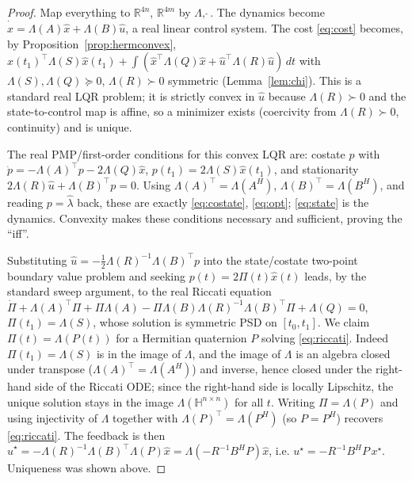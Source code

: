 \documentclass{amsart}
\theoremstyle{definition}
\newcommand{\HH}{\mathbb{H}}
\newcommand{\RR}{\mathbb{R}}
\begin{document}
\begin{proof}
Map everything to $\RR^{4n}$, $\RR^{4m}$ by $\Lambda,\widehat{\;}$. The
dynamics become $\dot{\widehat x}=\Lambda(A)\widehat x+\Lambda(B)\widehat
u$, a real linear control system. The cost \eqref{eq:cost} becomes, by
Proposition~\ref{prop:hermconvex},
$\widehat x(t_1)^\top\Lambda(S)\widehat x(t_1)+\int(\widehat
x^\top\Lambda(Q)\widehat x+\widehat u^\top\Lambda(R)\widehat u)\,dt$
with $\Lambda(S),\Lambda(Q)\succeq0$, $\Lambda(R)\succ0$ symmetric
(Lemma~\ref{lem:chi}). This is a standard real LQR problem; it is
strictly convex in $\widehat u$ because $\Lambda(R)\succ0$ and the
state-to-control map is affine, so a minimizer exists (coercivity from
$\Lambda(R)\succ0$, continuity) and is unique.

The real PMP/first-order conditions for this convex LQR are: costate
$p$ with $\dot p=-\Lambda(A)^\top p-2\Lambda(Q)\widehat x$,
$p(t_1)=2\Lambda(S)\widehat x(t_1)$, and stationarity
$2\Lambda(R)\widehat u+\Lambda(B)^\top p=0$. Using
$\Lambda(A)^\top=\Lambda(A^H)$, $\Lambda(B)^\top=\Lambda(B^H)$, and
reading $p=\widehat\lambda$ back, these are exactly
\eqref{eq:costate}, \eqref{eq:opt}; \eqref{eq:state} is the dynamics.
Convexity makes these conditions necessary and sufficient, proving the
``iff''.

Substituting $\widehat u=-\tfrac12\Lambda(R)^{-1}\Lambda(B)^\top p$ into
the state/costate two-point boundary value problem and seeking
$p(t)=2\Pi(t)\widehat x(t)$ leads, by the standard sweep argument, to
the real Riccati equation
$\dot\Pi+\Lambda(A)^\top\Pi+\Pi\Lambda(A)
-\Pi\Lambda(B)\Lambda(R)^{-1}\Lambda(B)^\top\Pi+\Lambda(Q)=0$,
$\Pi(t_1)=\Lambda(S)$, whose solution is symmetric PSD on $[t_0,t_1]$.
We claim $\Pi(t)=\Lambda(P(t))$ for a Hermitian quaternion $P$ solving
\eqref{eq:riccati}. Indeed $\Pi(t_1)=\Lambda(S)$ is in the image of
$\Lambda$, and the image of $\Lambda$ is an algebra closed under
transpose ($\Lambda(A)^\top=\Lambda(A^H)$) and inverse, hence closed
under the right-hand side of the Riccati ODE; since the right-hand side
is locally Lipschitz, the unique solution stays in the image
$\Lambda(\HH^{n\times n})$ for all $t$. Writing $\Pi=\Lambda(P)$ and
using injectivity of $\Lambda$ together with
$\Lambda(P)^\top=\Lambda(P^H)$ (so $P=P^H$) recovers \eqref{eq:riccati}.
The feedback is then
$\widehat u^\star=-\Lambda(R)^{-1}\Lambda(B)^\top\Lambda(P)\widehat x
=\Lambda(-R^{-1}B^HP)\widehat x$, i.e.
$u^\star=-R^{-1}B^HP\,x^\star$. Uniqueness was shown above.
\end{proof}
\end{document}
